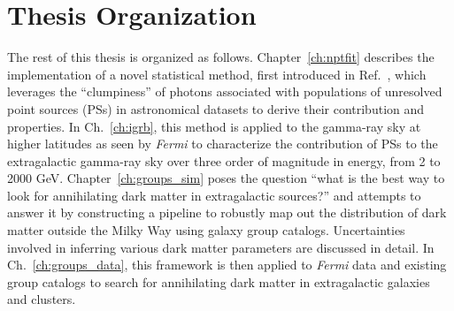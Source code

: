 \section{Thesis Organization}
\label{sec:summary}

The rest of this thesis is organized as follows. Chapter~\ref{ch:nptfit} describes the implementation of a novel statistical method, first introduced in Ref.~\cite{Lee:2015fea}, which leverages the ``clumpiness'' of photons associated with populations of unresolved point sources (PSs) in astronomical datasets to derive their contribution and properties. In Ch.~\ref{ch:igrb}, this method is applied to the gamma-ray sky at higher latitudes as seen by \emph{Fermi} to characterize the contribution of PSs to the extragalactic gamma-ray sky over three order of magnitude in energy, from 2 to 2000 GeV. Chapter~\ref{ch:groups_sim} poses the question ``what is the best way to look for annihilating dark matter in extragalactic sources?'' and attempts to answer it by constructing a pipeline to robustly map out the distribution of dark matter outside the Milky Way using galaxy group catalogs. Uncertainties involved in inferring various dark matter parameters are discussed in detail. In Ch.~\ref{ch:groups_data}, this framework is then applied to \emph{Fermi} data and existing group catalogs to search for annihilating dark matter in extragalactic galaxies and clusters.

\sectionline


